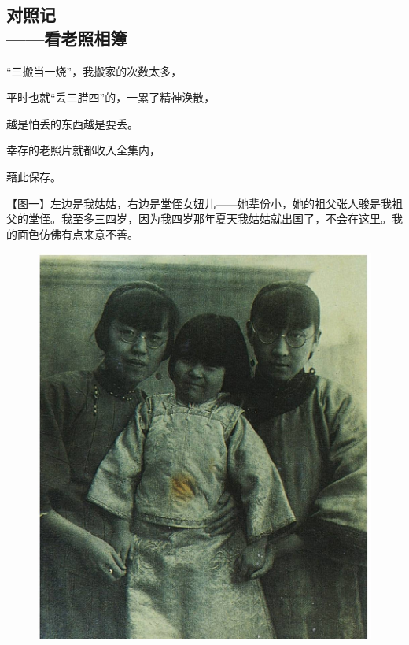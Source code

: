 \subsection{对照记\\\small{——看老照相簿}}


\par “三搬当一烧”，我搬家的次数太多，
\par 平时也就“丢三腊四”的，一累了精神涣散，
\par 越是怕丢的东西越是要丢。
\par 幸存的老照片就都收入全集内，
\par 藉此保存。
\par {}



\par 【图一】左边是我姑姑，右边是堂侄女妞儿——她辈份小，她的祖父张人骏是我祖父的堂侄。我至多三四岁，因为我四岁那年夏天我姑姑就出国了，不会在这里。我的面色仿佛有点来意不善。
\begin{figure}[htb]
    \centering %
    \includegraphics[scale=0.4]{picture/对照记1.jpeg}
\end{figure}


